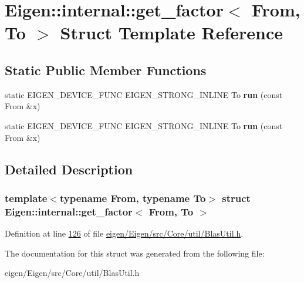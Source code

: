 \hypertarget{struct_eigen_1_1internal_1_1get__factor}{}\section{Eigen\+:\+:internal\+:\+:get\+\_\+factor$<$ From, To $>$ Struct Template Reference}
\label{struct_eigen_1_1internal_1_1get__factor}
\subsection*{Static Public Member Functions}
\begin{DoxyCompactItemize}
\item 
\mbox{\label{struct_eigen_1_1internal_1_1get__factor_abd089598b5a53790ba0d920340ea7b2b}} 
static E\+I\+G\+E\+N\+\_\+\+D\+E\+V\+I\+C\+E\+\_\+\+F\+U\+NC E\+I\+G\+E\+N\+\_\+\+S\+T\+R\+O\+N\+G\+\_\+\+I\+N\+L\+I\+NE To {\bfseries run} (const From \&x)
\item 
\mbox{\label{struct_eigen_1_1internal_1_1get__factor_abd089598b5a53790ba0d920340ea7b2b}} 
static E\+I\+G\+E\+N\+\_\+\+D\+E\+V\+I\+C\+E\+\_\+\+F\+U\+NC E\+I\+G\+E\+N\+\_\+\+S\+T\+R\+O\+N\+G\+\_\+\+I\+N\+L\+I\+NE To {\bfseries run} (const From \&x)
\end{DoxyCompactItemize}


\subsection{Detailed Description}
\subsubsection*{template$<$typename From, typename To$>$\newline
struct Eigen\+::internal\+::get\+\_\+factor$<$ From, To $>$}



Definition at line \hyperlink{eigen_2_eigen_2src_2_core_2util_2_blas_util_8h_source_l00126}{126} of file \hyperlink{eigen_2_eigen_2src_2_core_2util_2_blas_util_8h_source}{eigen/\+Eigen/src/\+Core/util/\+Blas\+Util.\+h}.



The documentation for this struct was generated from the following file\+:\begin{DoxyCompactItemize}
\item 
eigen/\+Eigen/src/\+Core/util/\+Blas\+Util.\+h\end{DoxyCompactItemize}
